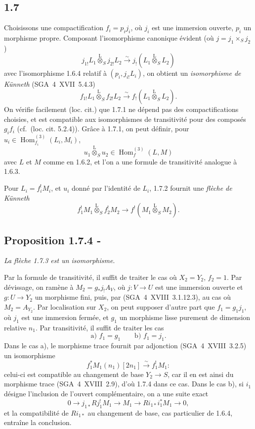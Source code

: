 \documentclass[11pt]{article}
\DeclareMathOperator{\Hom}{Hom}
\providecommand{\Hom}{\operatorname{Hom}}
\providecommand{\Hom}{\operatorname{Hom}}
\begin{document}
\subsection*{1.7}
Choisissons une compactification $f_i=p_i j_i$, où $j_i$ est une immersion ouverte, $p_i$ un morphisme propre. Composant l'isomorphisme canonique évident (où $j=j_1\times_S j_2$)
\[
j_{1!}L_1\overset{\mathrm{L}}{\otimes}_{S}j_{2!}L_2\xrightarrow{\sim}j_{!}(L_1\overset{\mathrm{L}}{\otimes}_{S}L_2)
\]
avec l'isomorphisme 1.6.4 relatif à $(p_i,j_{i!}L_i)$, on obtient un \emph{isomorphisme de Künneth} (SGA~4~XVII~5.4.3)
\begin{equation}\tag{1.7.1}
f_{1!}L_1\overset{\mathrm{L}}{\otimes}_{S}f_{2!}L_2\xrightarrow{\sim}f_{!}(L_1\overset{\mathrm{L}}{\otimes}_{S}L_2).
\end{equation}
On vérifie facilement (loc. cit.) que 1.7.1 ne dépend pas des compactifications choisies, et est compatible aux isomorphismes de transitivité pour des composés $g_if_i$ (cf.~(loc. cit. 5.2.4)). Grâce à 1.7.1, on peut définir, pour $u_i\in\Hom_{f_i}^{(3)}(L_i,M_i)$,
\begin{equation}\tag{1.7.2}
u_1\overset{\mathrm{L}}{\otimes}_{S}u_2\in\Hom_f^{(3)}(L,M)
\end{equation}
avec $L$ et $M$ comme en 1.6.2, et l'on a une formule de transitivité analogue à 1.6.3.

Pour $L_i=f_i^{!}M_i$, et $u_i$ donné par l'identité de $L_i$, 1.7.2 fournit une \emph{flèche de Künneth}
\begin{equation}\tag{1.7.3}
f_1^{!}M_1\overset{\mathrm{L}}{\otimes}_{S}f_2^{!}M_2\longrightarrow f^{!}(M_1\overset{\mathrm{L}}{\otimes}_{S}M_2).
\end{equation}

\subsection*{Proposition 1.7.4 -}
\emph{La flèche 1.7.3 est un isomorphisme}.

Par la formule de transitivité, il suffit de traiter le cas où $X_2=Y_2$, $f_2=1$. Par dévissage, on ramène à $M_2=g_{*}j_{!}A_V$, où $j:V\to U$ est une immersion ouverte et $g:U\to Y_2$ un morphisme fini, puis, par (SGA~4~XVIII~3.1.12.3), au cas où $M_2=A_{Y_2}$. Par localisation sur $X_2$, on peut supposer d'autre part que $f_1=g_1j_1$, où $j_1$ est une immersion fermée, et $g_1$ un morphisme lisse purement de dimension relative $n_1$. Par transitivité, il suffit de traiter les cas
\[
\text{a) } f_1=g_1\qquad \text{b) } f_1=j_1.
\]
Dans le cas a), le morphisme trace fournit par adjonction (SGA~4~XVIII~3.2.5) un isomorphisme
\[
f_1^{*}M_1(n_1)[2n_1]\xrightarrow{\sim}f_1^{!}M_1 :
\]
celui-ci est compatible au changement de base $Y_2\to S$, car il en est ainsi du morphisme trace (SGA~4~XVIII~2.9), d'où 1.7.4 dans ce cas. Dans le cas b), si $i_1$ désigne l'inclusion de l'ouvert complémentaire, on a une suite exact
\[
0\longrightarrow j_{1*}Rj_1^{!}M_1\longrightarrow M_1\longrightarrow Ri_{1*}i_1^{*}M_1\longrightarrow0,
\]
et la compatibilité de $Ri_{1*}$ au changement de base, cas particulier de 1.6.4, entraîne la conclusion.
\end{document}
